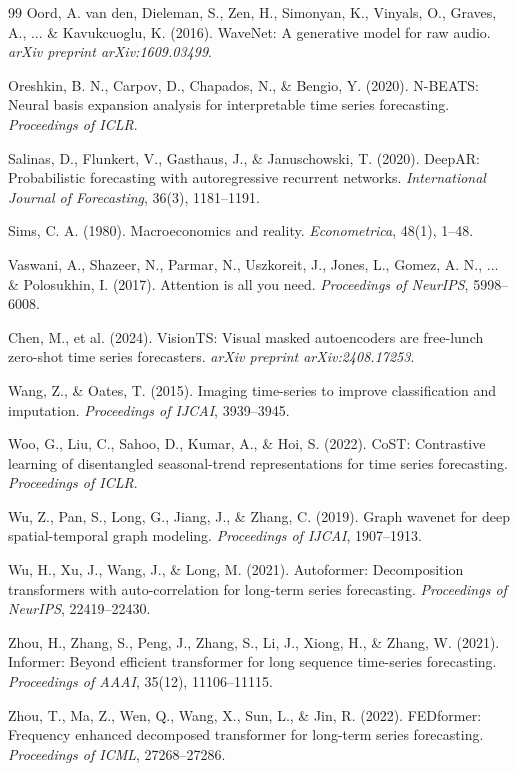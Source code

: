 \documentclass[preprint,12pt,authoryear]{elsarticle}
\begin{document}
\begin{thebibliography}{99}
Oord, A. van den, Dieleman, S., Zen, H., Simonyan, K., Vinyals, O., Graves, A., ... \& Kavukcuoglu, K. (2016). WaveNet: A generative model for raw audio. \textit{arXiv preprint arXiv:1609.03499}.

Oreshkin, B. N., Carpov, D., Chapados, N., \& Bengio, Y. (2020). N-BEATS: Neural basis expansion analysis for interpretable time series forecasting. \textit{Proceedings of ICLR}.

Salinas, D., Flunkert, V., Gasthaus, J., \& Januschowski, T. (2020). DeepAR: Probabilistic forecasting with autoregressive recurrent networks. \textit{International Journal of Forecasting}, 36(3), 1181--1191.

Sims, C. A. (1980). Macroeconomics and reality. \textit{Econometrica}, 48(1), 1--48.

Vaswani, A., Shazeer, N., Parmar, N., Uszkoreit, J., Jones, L., Gomez, A. N., ... \& Polosukhin, I. (2017). Attention is all you need. \textit{Proceedings of NeurIPS}, 5998--6008.

Chen, M., et al. (2024). VisionTS: Visual masked autoencoders are free-lunch zero-shot time series forecasters. \textit{arXiv preprint arXiv:2408.17253}.

Wang, Z., \& Oates, T. (2015). Imaging time-series to improve classification and imputation. \textit{Proceedings of IJCAI}, 3939--3945.

Woo, G., Liu, C., Sahoo, D., Kumar, A., \& Hoi, S. (2022). CoST: Contrastive learning of disentangled seasonal-trend representations for time series forecasting. \textit{Proceedings of ICLR}.

Wu, Z., Pan, S., Long, G., Jiang, J., \& Zhang, C. (2019). Graph wavenet for deep spatial-temporal graph modeling. \textit{Proceedings of IJCAI}, 1907--1913.

Wu, H., Xu, J., Wang, J., \& Long, M. (2021). Autoformer: Decomposition transformers with auto-correlation for long-term series forecasting. \textit{Proceedings of NeurIPS}, 22419--22430.

Zhou, H., Zhang, S., Peng, J., Zhang, S., Li, J., Xiong, H., \& Zhang, W. (2021). Informer: Beyond efficient transformer for long sequence time-series forecasting. \textit{Proceedings of AAAI}, 35(12), 11106--11115.

Zhou, T., Ma, Z., Wen, Q., Wang, X., Sun, L., \& Jin, R. (2022). FEDformer: Frequency enhanced decomposed transformer for long-term series forecasting. \textit{Proceedings of ICML}, 27268--27286.

\end{thebibliography}
\end{document}
